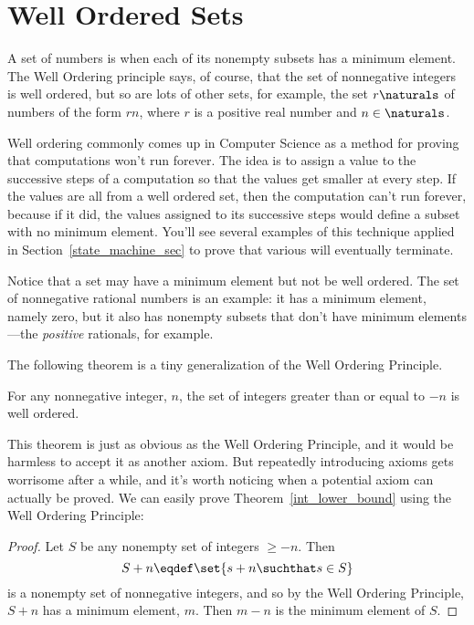 \section{Well Ordered Sets}\label{well_ordering_sec}

A set of numbers is  when each of its nonempty
subsets has a minimum element.  The Well Ordering principle says, of
course, that the set of nonnegative integers is well ordered, but so
are lots of other sets, for example, the set $r\naturals$ of numbers
of the form $rn$, where $r$ is a positive real number and $n \in
\naturals$.

Well ordering commonly comes up in Computer Science as a method for
proving that computations won't run forever.  The idea is to assign a
value to the successive steps of a computation so that the values get
smaller at every step.  If the values are all from a well ordered set,
then the computation can't run forever, because if it did, the values
assigned to its successive steps would define a subset with no minimum
element.  You'll see several examples of this technique applied in
Section~\ref{state_machine_sec} to prove that various  will eventually terminate.

Notice that a set may have a minimum element but not be well ordered.
The set of nonnegative rational numbers is an example: it has a
minimum element, namely zero, but it also has nonempty subsets that
don't have minimum elements ---the \emph{positive} rationals, for
example.

The following theorem is a tiny generalization of the Well Ordering
Principle.

\begin{theorem}\label{int_lower_bound}
For any nonnegative integer, $n$, the set of integers greater than or equal to $-n$
is well ordered.
\end{theorem}

This theorem is just as obvious as the Well Ordering Principle, and it
would be harmless to accept it as another axiom.  But repeatedly
introducing axioms gets worrisome after a while, and it's worth
noticing when a potential axiom can actually be proved.  We can easily
prove Theorem~\ref{int_lower_bound} using the Well Ordering Principle:

\begin{proof}
Let $S$ be any nonempty set of integers $\geq -n$.  Then
\[
S+n \eqdef \set{s+n \suchthat s \in S}
\]
is a nonempty set of nonnegative integers, and so by the Well Ordering
Principle, $S+n$ has a minimum element, $m$.  Then $m - n$ is the
minimum element of $S$.
\end{proof}

